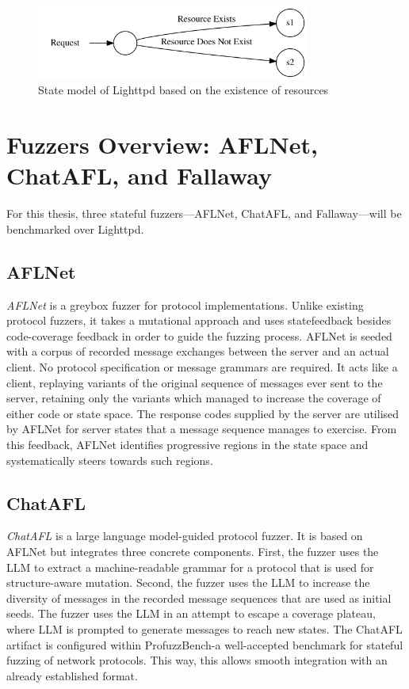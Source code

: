 \begin{figure}[H]
    \centering
    \includegraphics[width=0.8\textwidth]{Images/existent_nonexistent_resource.png}
    \caption{State model of Lighttpd based on the existence of resources}
    \label{fig:existent_nonexistent_resource_statemodel}
\end{figure}

\section{Fuzzers Overview: AFLNet, ChatAFL, and Fallaway}

For this thesis, three stateful fuzzers—AFLNet, ChatAFL, and Fallaway—will be benchmarked over Lighttpd.
 
\subsection{AFLNet}
\textit{AFLNet} \cite{AFLNet} is a greybox fuzzer for protocol implementations. Unlike existing protocol fuzzers, it takes a mutational approach and uses statefeedback besides code-coverage feedback in order to guide the fuzzing process. AFLNet is seeded with a corpus of recorded message exchanges between the server and an actual client. No protocol specification or message grammars are required. It acts like a client, replaying variants of the original sequence of messages ever sent to the server, retaining only the variants which managed to increase the coverage of either code or state space. The response codes supplied by the server are utilised by AFLNet for server states that a message sequence manages to exercise. From this feedback, AFLNet identifies progressive regions in the state space and systematically steers towards such regions. 



\subsection{ChatAFL}
\textit{ChatAFL} \cite{chatafl} is a large language model-guided protocol fuzzer. It is based on AFLNet but integrates three concrete components. First, the fuzzer uses the LLM to extract a machine-readable grammar for a protocol that is used for structure-aware mutation. Second, the fuzzer uses the LLM to increase the diversity of messages in the recorded message sequences that are used as initial seeds. The fuzzer uses the LLM in an attempt to escape a coverage plateau, where LLM is prompted to generate messages to reach new states.
The ChatAFL artifact is configured within ProfuzzBench-a well-accepted benchmark for stateful fuzzing of network protocols. This way, this allows smooth integration with an already established format.



